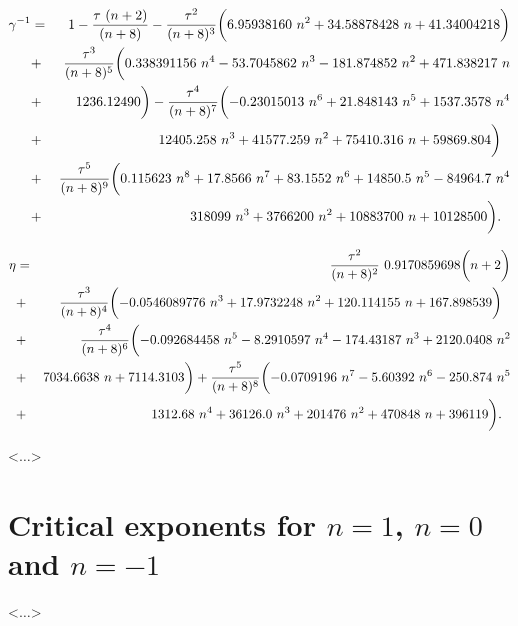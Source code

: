 \documentclass[aps,prb,preprint,showpacs,preprintnumbers,amsmath,amssymb]{revtex4}
\newcommand{\comment}[1]{} %
\begin{document}
\begin{eqnarray}
\label{gamma-tau}
\gamma^{-1} &=& 1 - {\tau~ (n + 2) \over (n + 8)}
- {\tau^2 \over (n + 8)^3} \biggl( 6.95938160~n^2 + 34.58878428~n + 41.34004218 \biggr)
\nonumber \\
&+& {\tau^3 \over (n + 8)^5} \biggl(0.338391156~n^4 - 53.7045862~n^3 - 181.874852~n^2
+ 471.838217~n
\nonumber \\
&+& 1236.12490 \biggr) - {\tau^4 \over (n + 8)^7} \biggl(- 0.23015013~n^6 + 21.848143~n^5
+ 1537.3578~n^4
\nonumber \\
&+& 12405.258~n^3 + 41577.259~n^2 + 75410.316~n + 59869.804 \biggr) \ \
\nonumber \\
&+& {\tau^5 \over (n + 8)^9} \biggl(0.115623~n^8 + 17.8566~n^7 + 83.1552~n^6 + 14850.5~n^5
- 84964.7~n^4
\nonumber \\
&+& 318099~n^3 + 3766200~n^2 + 10883700~n + 10128500 \biggr). \ \
\end{eqnarray}

\begin{eqnarray}
\label{eta-tau}
\eta &=& {\tau^2 \over (n + 8)^2}~0.9170859698 \biggl(n + 2 \biggr)
\nonumber \\
&+& {\tau^3 \over (n + 8)^4} \biggl(- 0.0546089776~n^3 + 17.9732248~n^2 + 120.114155~n
+ 167.898539 \biggr) \ \
\nonumber \\
&+& {\tau^4 \over (n + 8)^6} \biggl(- 0.092684458~n^5 - 8.2910597~n^4 - 174.43187~n^3
+ 2120.0408~n^2
\nonumber \\
&+& 7034.6638~n + 7114.3103 \biggr) + {\tau^5 \over (n + 8)^8} \biggl(- 0.0709196~n^7
- 5.60392~n^6 - 250.874~n^5
\nonumber \\
&+& 1312.68~n^4 + 36126.0~n^3 + 201476~n^2 + 470848~n + 396119 \biggr). \ \
\end{eqnarray}


<$\dots$>
\comment{
Pseudo-$\epsilon$ expansions for other critical exponents can be deduced from (4), (5)
using well-known scaling relations. The series for the correlation length exponent
$\nu$, for example, results from the formula
\begin{equation}
\label{scaling}
\gamma = \nu (2 - \eta).
\end{equation}
}

\section{Critical exponents for $n=1$, $n=0$ and $n =-1$}

<$\dots$>
\comment{
It is of major interest to analyze numerical results given by the
obtained expansions for the values of $n$ under which the model
(1) describes physically realizable systems and is exactly
solvable. That is why further we concentrate on the cases $n=1$,
$n=0$, and $n =-1$. Pseudo-$\epsilon$ expansions for critical
exponents we'll deal with are as follows:
}
\end{document}
